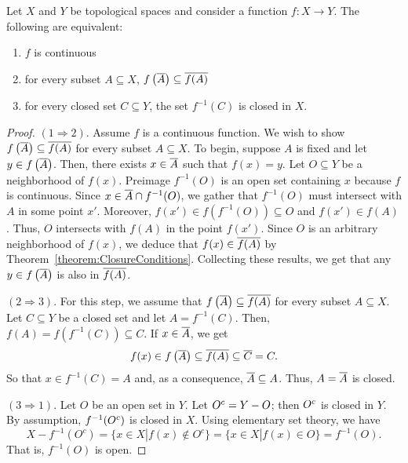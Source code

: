 \begin{theorem} \label{theorem:ContinuityEquivalentConditions}
Let $X$ and $Y$ be topological spaces and consider a function $f \colon X \rightarrow Y$.
The following are equivalent:
\begin{enumerate}
\item $f$ is continuous
\item for every subset $A \subseteq X$, $f \left( \overline{A} \right) \subseteq \overline{ f(A) }$
\item for every closed set $C \subseteq Y$, the set $f^{-1} (C)$ is closed in $X$.
\end{enumerate}
\end{theorem}
\begin{proof}
$(1 \Rightarrow 2)$.
Assume $f$ is a continuous function.
We wish to show $f \left( \overline{A} \right) \subseteq \overline{ f(A) }$ for every subset $A \subseteq X$.
To begin, suppose $A$ is fixed and let $y \in f \left( \overline{A} \right)$.
Then, there exists $x \in \overline{A}$ such that $f(x) = y$.
Let $O \subseteq Y$ be a neighborhood of $f(x)$.
Preimage $f^{-1}(O)$ is an open set containing $x$ because $f$ is continuous.
Since $x \in \overline{A} \cap f^{-1}(O)$, we gather that $f^{-1}(O)$ must intersect with $A$ in some point $x'$.
Moreover, $f(x') \in f \left( f^{-1}(O) \right) \subseteq O$ and $f(x') \in f(A)$.
Thus, $O$ intersects with $f(A)$ in the point $f(x')$.
Since $O$ is an arbitrary neighborhood of $f(x)$, we deduce that $f(x) \in \overline{ f(A) }$ by Theorem~\ref{theorem:ClosureConditions}.
Collecting these results, we get that any $y \in f \left( \overline{A} \right)$ is also in $\overline{ f(A) }$.

$(2 \Rightarrow 3)$.
For this step, we assume that $f \left( \overline{A} \right) \subseteq \overline{ f(A) }$ for every subset $A \subseteq X$.
Let $C \subseteq Y$ be a closed set and let $A = f^{-1} (C)$.
Then, $f(A) = f \left( f^{-1}(C) \right) \subseteq C$.
If $x \in \overline{A}$, we get
\begin{equation*}
f(x) \in f \left( \overline{A} \right) \subseteq \overline{f (A)} \subseteq \overline{C} = C.
\end{equation*}
So that $x \in f^{-1} (C) = A$ and, as a consequence, $\overline{A} \subseteq A$.
Thus, $A = \overline{A}$ is closed.

$(3 \Rightarrow 1)$.
Let $O$ be an open set in $Y$.
Let ${O}^{c} = Y - O$; then ${O}^{c}$ is closed in $Y$.
By assumption, $f^{-1} ({O}^{c})$ is closed in $X$.
Using elementary set theory, we have
\begin{equation*}
X - f^{-1}(O^c) = \{ x\in X | f(x) \notin O^c \} = \{ x \in X | f(x) \in O \} = f^{-1} (O).
\end{equation*}
That is, $f^{-1} (O)$ is open.
\end{proof}

